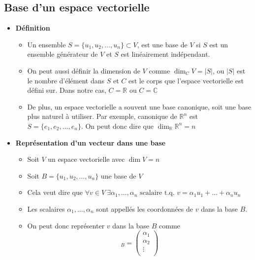 \subsection*{Base d'un espace vectorielle} \begin{itemize}

    \item[] \textbf{Définition} \begin{itemize}[itemsep = 0.5em]
              \item[] Un ensemble $S = \{ u_1, u_2, \ldots, u_n \} \subset V$, est une base de $V$ si
                    $S$ est un ensemble générateur de $V$ et $S$ est linéairement indépendant.
              \item[] On peut aussi définir la dimension de $V$ comme $\dim_C V = |S|$,
                    ou $|S|$ est le nombre d'élément dans $S$ et $C$ est le corps que l'espace vectorielle
                    est défini sur. Dans notre cas, $C = \mathbb{R}$ ou $C = \mathbb{C}$
              \item[] De plus, un espace vectorielle a souvent une base canonique, soit une base
                    plus naturel à utiliser. Par exemple, canonique de $\mathbb{R}^n$ est $S = \{ e_1, e_2, \ldots, e_n \}$. 
                    On peut donc dire que $\dim_\mathbb{R} \mathbb{R}^n = n$
          \end{itemize}
    \item[] \textbf{Représentation d'un vecteur dans une base} \begin{itemize}[itemsep = 0.5em]
              \item[] Soit $V$ un espace vectorielle avec $\dim V = n$
              \item[] Soit $B = \{ u_1, u_2, \ldots, u_n \}$ une base de $V$
              \item[] Cela veut dire que $ \forall v \in V  \ \exists \alpha_1, \ldots, \alpha_n \text{ scalaire t.q. } v = \alpha_1 u_1 + \ldots + \alpha_n u_n$
              \item[] Les scalaires $\alpha_1, \ldots, \alpha_n$ sont appellés les coordonnées de $v$ dans la base $B$.
              \item[] On peut donc représenter $v$ dans la base $B$ comme \begin{equation*}
                [v]_B = \begin{pmatrix}
                    \alpha_1 \\
                    \alpha_2 \\
                    \vdots \\

\end{pmatrix}
\end{equation*}
\end{itemize}
\end{itemize}
